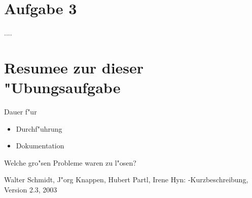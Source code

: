 \documentclass[a4paper,11pt,titlepage]{article}
\begin{document}
    \section{Aufgabe 3}
    ....



    \section{Resumee zur dieser "Ubungsaufgabe}
    Dauer f"ur
    \begin{itemize}
        \item Durchf"uhrung
        \item Dokumentation
    \end{itemize}
    Welche gro"sen Probleme waren zu l"osen?

    \begin{thebibliography}{99}
        Walter Schmidt, J"org Knappen, Hubert Partl, Irene Hyn:
        \LaTeXe-Kurzbeschreibung,    Version 2.3, 2003


    \end{thebibliography}
\end{document}
